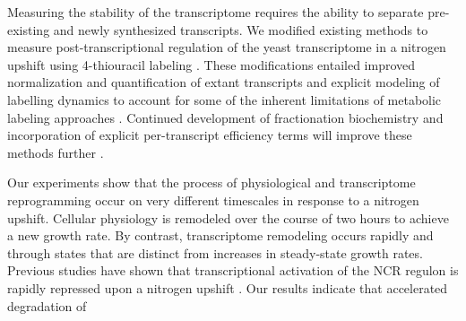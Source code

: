 Measuring the stability of the transcriptome requires the ability to
separate pre-existing and newly synthesized transcripts. We modified
existing methods to measure 
post-transcriptional regulation of the yeast transcriptome in a
nitrogen upshift using 4-thiouracil labeling
\parencite{miller2011dynamic,neymotin2014determination,munchel2011dynamic}. These
modifications entailed improved normalization and quantification of
extant transcripts and explicit modeling of labelling dynamics to
account for some of the inherent limitations of metabolic labeling
approaches \parencite{perez2013eukaryotic}. Continued development of
fractionation biochemistry \parencite{duffy2015tracking} and incorporation of
explicit per-transcript efficiency terms will improve these
methods further \parencite{chan2017non}.

Our experiments show that the process of physiological and 
transcriptome reprogramming occur on very different timescales in response
to a nitrogen upshift. Cellular physiology is remodeled over the
course of two hours to achieve a new growth rate.
By contrast, transcriptome remodeling occurs rapidly and through
states that are distinct
from increases in steady-state growth rates. 
Previous studies have shown that transcriptional activation of the NCR
regulon is rapidly repressed upon a nitrogen upshift
\parencite{airoldi2016steady}. Our
results indicate that accelerated degradation of 
